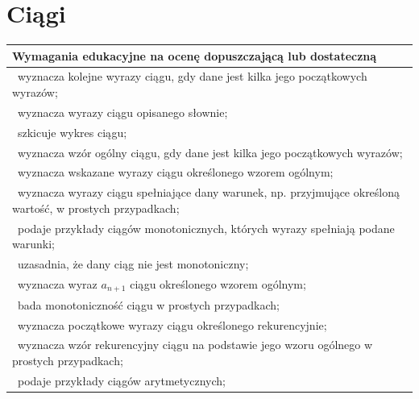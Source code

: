 \documentclass[12pt,a4paper]{article}
\begin{document}
	\section{Ciągi}
	
	\begin{longtable}{|p{16cm}|}
		\hline
		
		\textbf{Wymagania edukacyjne na ocenę dopuszczającą lub dostateczną} \\ \hline
		
		\textbullet\ wyznacza kolejne wyrazy ciągu, gdy dane jest kilka jego początkowych wyrazów; \\
		
		\textbullet\ wyznacza wyrazy ciągu opisanego słownie; \\
		
		\textbullet\ szkicuje wykres ciągu; \\
		
		\textbullet\ wyznacza wzór ogólny ciągu, gdy dane jest kilka jego początkowych wyrazów; \\
		
		\textbullet\ wyznacza wskazane wyrazy ciągu określonego wzorem ogólnym; \\
		
		\textbullet\ wyznacza wyrazy ciągu spełniające dany warunek, np. przyjmujące określoną wartość, w prostych przypadkach; \\
		
		\textbullet\ podaje przykłady ciągów monotonicznych, których wyrazy spełniają podane warunki; \\
		
		\textbullet\ uzasadnia, że dany ciąg nie jest monotoniczny; \\
		
		\textbullet\ wyznacza wyraz $a_{n+1}$ ciągu określonego wzorem ogólnym; \\
		
		\textbullet\ bada monotoniczność ciągu w prostych przypadkach; \\
		
		\textbullet\ wyznacza początkowe wyrazy ciągu określonego rekurencyjnie; \\
		
		\textbullet\ wyznacza wzór rekurencyjny ciągu na podstawie jego wzoru ogólnego w prostych przypadkach; \\
		
		\textbullet\ podaje przykłady ciągów arytmetycznych; \\
		

\end{longtable}
\end{document}

